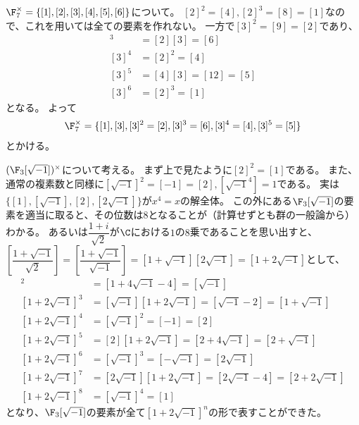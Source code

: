 \documentclass[uplatex]{jsarticle}
\begin{document}
\begin{eg}
  $\F_7^\times=\{[1],[2],[3],[4],[5],[6]\}$について。
  $[2]^2=[4], [2]^3=[8]=[1]$なので、これを用いては全ての要素を作れない。
  一方で$[3]^2=[9]=[2]$であり、
  \begin{align*}
    [3]^3&=[2][3]=[6]\\
    [3]^4&=[2]^2=[4]\\
    [3]^5&=[4][3]=[12]=[5]\\
    [3]^6&=[2]^3=[1]
  \end{align*}
  となる。
  よって
  \begin{align*}
    \F_7^\times=\{[1],[3],[3]^2=[2],[3]^3=[6],[3]^4=[4],[3]^5=[5]\}
  \end{align*}
  とかける。
\end{eg}

\begin{eg}
  $(\F_3[\sqrt{-1}])^\times$について考える。
  まず上で見たように$[2]^2=[1]$である。
  また、通常の複素数と同様に$[\sqrt{-1}]^2=[-1]=[2], [\sqrt{-1}^4]=1$である。
  実は$\{[1],[\sqrt{-1}],[2],[2\sqrt{-1}]\}$が$x^4=x$の解全体。
  この外にある$\F_3[\sqrt{-1}]$の要素を適当に取ると、その位数は$8$となることが（計算せずとも群の一般論から）わかる。
  あるいは$\dfrac{1+i}{\sqrt{2}}$が$\C$における$1$の$8$乗であることを思い出すと、
  $[\dfrac{1+\sqrt{-1}}{\sqrt{2}}]=[\dfrac{1+\sqrt{-1}}{\sqrt{-1}}]=[1+\sqrt{-1}][2\sqrt{-1}]=[1+2\sqrt{-1}]$として、
  \begin{align*}
    [1+2\sqrt{-1}]^2&=[1+4\sqrt{-1}-4]=[\sqrt{-1}]\\
    [1+2\sqrt{-1}]^3&=[\sqrt{-1}][1+2\sqrt{-1}]=[\sqrt{-1}-2]=[1+\sqrt{-1}]\\
    [1+2\sqrt{-1}]^4&=[\sqrt{-1}]^2=[-1]=[2]\\
    [1+2\sqrt{-1}]^5&=[2][1+2\sqrt{-1}]=[2+4\sqrt{-1}]=[2+\sqrt{-1}]\\
    [1+2\sqrt{-1}]^6&=[\sqrt{-1}]^3=[-\sqrt{-1}]=[2\sqrt{-1}]\\
    [1+2\sqrt{-1}]^7&=[2\sqrt{-1}][1+2\sqrt{-1}]=[2\sqrt{-1}-4]=[2+2\sqrt{-1}]\\
    [1+2\sqrt{-1}]^8&=[\sqrt{-1}]^4=[1]
  \end{align*}
  となり、$\F_3[\sqrt{-1}]$の要素が全て$[1+2\sqrt{-1}]^n$の形で表すことができた。
\end{eg}
\end{document}

